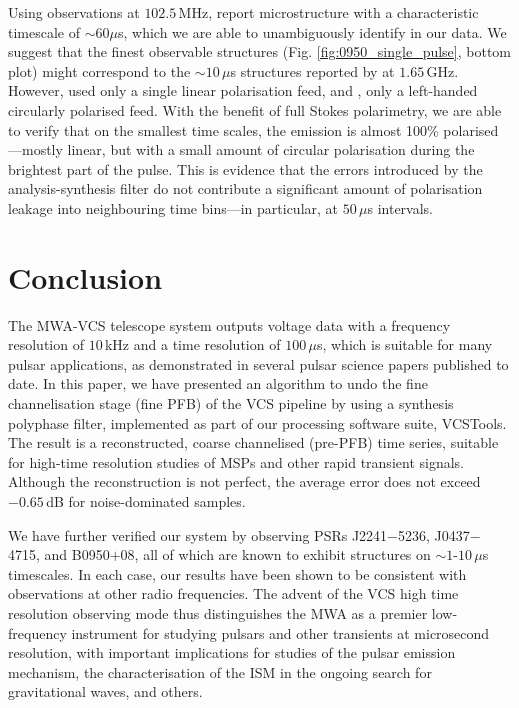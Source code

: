 \documentclass{pasa}%
\newcommand{\vcstools}{VCSTools}
\newcommand{\psrslowB}{B0950$+$08}
\newcommand{\psrkaurJ}{J2241$-$5236}
\newcommand{\psrbhatJ}{J0437$-$4715}
\begin{document}
Using observations at $102.5\,$MHz, \citet{Kuzmin2003} report microstructure with a characteristic timescale of $\sim 60\mu$s, which we are able to unambiguously identify in our data.
We suggest that the finest observable structures (Fig. \ref{fig:0950_single_pulse}, bottom plot) might correspond to the $\sim 10\,\mu$s structures reported by \citet{Popov2002} at $1.65\,$GHz.
However, \citet{Kuzmin2003} used only a single linear polarisation feed, and \citet{Popov2002}, only a left-handed circularly polarised feed.
With the benefit of full Stokes polarimetry, we are able to verify that on the smallest time scales, the emission is almost 100\% polarised---mostly linear, but with a small amount of circular polarisation during the brightest part of the pulse.
This is evidence that the errors introduced by the analysis-synthesis filter do not contribute a significant amount of polarisation leakage into neighbouring time bins---in particular, at $50\,\mu$s intervals.

\section{Conclusion}

The MWA-VCS telescope system outputs voltage data with a frequency resolution of $10\,$kHz and a time resolution of $100\,\mu$s, which is suitable for many pulsar applications, as demonstrated in several pulsar science papers published to date.
In this paper, we have presented an algorithm to undo the fine channelisation stage (fine PFB) of the VCS pipeline by using a synthesis polyphase filter, implemented as part of our processing software suite, \vcstools{}.
The result is a reconstructed, coarse channelised (pre-PFB) time series, suitable for high-time resolution studies of MSPs and other rapid transient signals.
Although the reconstruction is not perfect, the average error does not exceed $-0.65\,$dB for noise-dominated samples.

We have further verified our system by observing PSRs \psrkaurJ{}, \psrbhatJ{}, and \psrslowB{}, all of which are known to exhibit structures on $\sim 1$-$10\,\mu$s timescales.
In each case, our results have been shown to be consistent with observations at other radio frequencies.
The advent of the VCS high time resolution observing mode thus distinguishes the MWA as a premier low-frequency instrument for studying pulsars and other transients at microsecond resolution, with important implications for studies of the pulsar emission mechanism, the characterisation of the ISM in the ongoing search for gravitational waves, and others.
\end{document}
